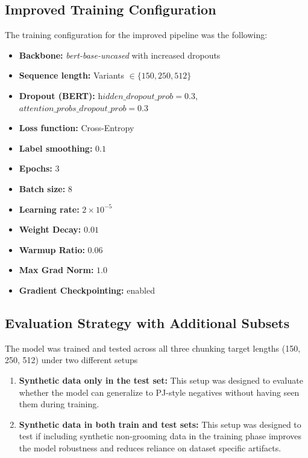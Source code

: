 \subsection{Improved Training Configuration}

The training configuration for the improved pipeline was the following:

\begin{itemize}
  \item \textbf{Backbone:} \textit{bert-base-uncased} with increased dropouts
  \item \textbf{Sequence length:} Variants \(\in \{150, 250, 512\}\) 
  \item \textbf{Dropout (BERT):} \(\textit{hidden\_dropout\_prob}=0.3\), \(\textit{attention\_probs\_dropout\_prob}=0.3\)
  \item \textbf{Loss function:} Cross-Entropy 
  \item \textbf{Label smoothing:} \(0.1\) 
  \item \textbf{Epochs:} \(3\)
  \item \textbf{Batch size:} \(8\)
  \item \textbf{Learning rate:} \(2\times10^{-5}\)
  \item \textbf{Weight Decay:} \(0.01\)
  \item \textbf{Warmup Ratio:} \(0.06\)
  \item \textbf{Max Grad Norm:} \(1.0\)
  \item \textbf{Gradient Checkpointing:} enabled 
\end{itemize}


\subsection{Evaluation Strategy with Additional Subsets}

The model was trained and tested across all three chunking target lengths (150, 250, 512) under two different setups
\begin{enumerate}
\item \textbf{Synthetic data only in the test set:} This setup was designed to evaluate whether the model can generalize to PJ-style negatives without having seen them during training.
\item \textbf{Synthetic data in both train and test sets:} This setup was designed to test if including synthetic non-grooming data in the training phase improves the model robustness and reduces reliance on dataset specific artifacts.
\end{enumerate}

